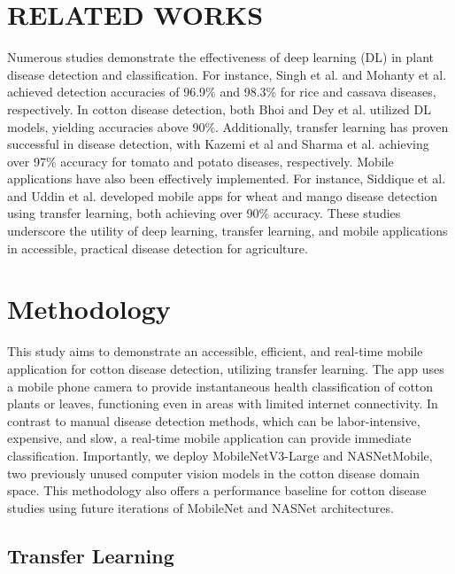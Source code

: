 \documentclass[conference]{IEEEtran}
\begin{document}
\section{RELATED WORKS}

Numerous studies demonstrate the effectiveness of deep learning (DL) in plant disease detection and classification. For instance, Singh et al. \cite{Singh-etal} and Mohanty et al. \cite{Mohanty-etal} achieved detection accuracies of 96.9\% and 98.3\% for rice and cassava diseases, respectively. In cotton disease detection, both Bhoi \cite{Bhoi} and Dey et al.\cite{Dey-etal} utilized DL models, yielding accuracies above 90\%. Additionally, transfer learning has proven successful in disease detection, with Kazemi et al\cite{Kazemi-etal} and Sharma et al.\cite{Sharma-etal} achieving over 97\% accuracy for tomato and potato diseases, respectively. Mobile applications have also been effectively implemented. For instance, Siddique et al.\cite{Siddique-etal} and Uddin et al.\cite{Uddin-etal} developed mobile apps for wheat and mango disease detection using transfer learning, both achieving over 90\% accuracy. These studies underscore the utility of deep learning, transfer learning, and mobile applications in accessible, practical disease detection for agriculture.

\section{Methodology}

This study aims to demonstrate an accessible, efficient, and real-time mobile application for cotton disease detection, utilizing transfer learning. The app uses a mobile phone camera to provide instantaneous health classification of cotton plants or leaves, functioning even in areas with limited internet connectivity. In contrast to manual disease detection methods, which can be labor-intensive, expensive, and slow, a real-time mobile application can provide immediate classification. Importantly, we deploy MobileNetV3-Large and NASNetMobile, two previously unused computer vision models in the cotton disease domain space. This methodology also offers a performance baseline for cotton disease studies using future iterations of MobileNet and NASNet architectures. 


\subsection{Transfer Learning}
\end{document}
